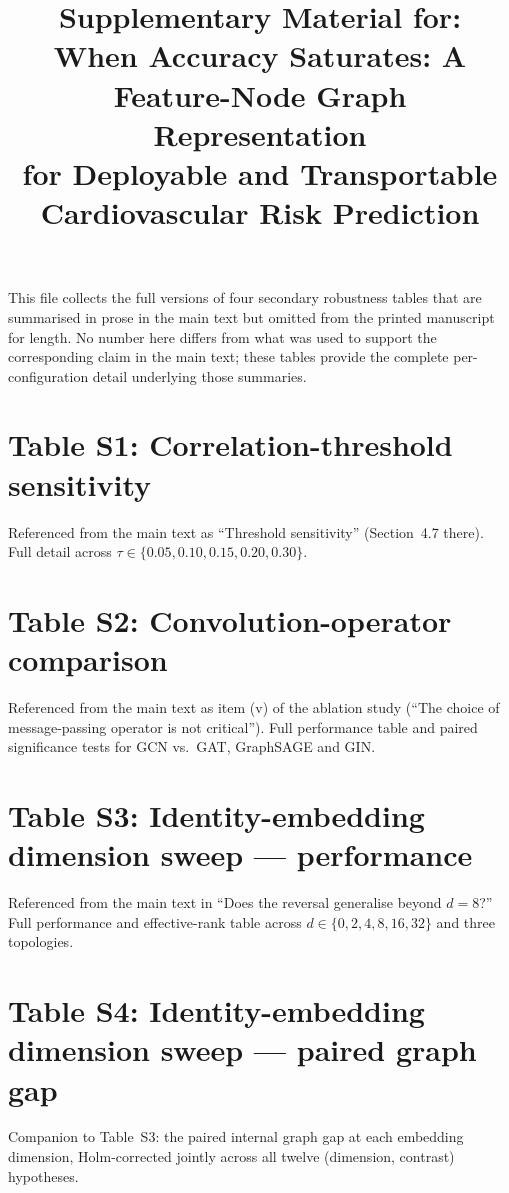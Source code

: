 \documentclass[journal]{IEEEtran}
\begin{document}
\title{Supplementary Material for:\\
When Accuracy Saturates: A Feature-Node Graph Representation\\
for Deployable and Transportable Cardiovascular Risk Prediction}

\author{}
\maketitle

\noindent This file collects the full versions of four secondary
robustness tables that are summarised in prose in the main text but
omitted from the printed manuscript for length. No number here differs
from what was used to support the corresponding claim in the main text;
these tables provide the complete per-configuration detail underlying
those summaries.

\section*{Table S1: Correlation-threshold sensitivity}
\label{sec:supp_threshold}
Referenced from the main text as ``Threshold sensitivity''
(Section~4.7 there). Full detail across $\tau\in\{0.05,0.10,0.15,0.20,0.30\}$.



\section*{Table S2: Convolution-operator comparison}
\label{sec:supp_conv}
Referenced from the main text as item (v) of the ablation study
(``The choice of message-passing operator is not critical''). Full
performance table and paired significance tests for GCN vs.\ GAT,
GraphSAGE and GIN.



\section*{Table S3: Identity-embedding dimension sweep --- performance}
\label{sec:supp_nodeidsweep}
Referenced from the main text in ``Does the reversal generalise beyond
$d=8$?'' Full performance and effective-rank table across
$d\in\{0,2,4,8,16,32\}$ and three topologies.



\section*{Table S4: Identity-embedding dimension sweep --- paired graph gap}
\label{sec:supp_nodeidgapsweep}
Companion to Table~S3: the paired internal graph gap at each embedding
dimension, Holm-corrected jointly across all twelve (dimension,
contrast) hypotheses.


\end{document}
